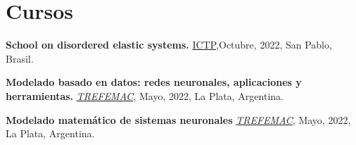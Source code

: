 \documentclass[a4paper,10pt]{article}
\begin{document}
\begin{adjustbox}{valign=t}
\begin{minipage}{0.5\textwidth}
\section*{Cursos}
\begin{description}
    \raggedright
	\item [-] \textbf{School on disordered elastic systems.} \href{https://www.ictp-saifr.org/des2022/}{ICTP},Octubre, 2022, San Pablo, Brasil.
    \item [-] \textbf{Modelado basado en datos: redes neuronales, aplicaciones y herramientas.} 
	{\href{https://sites.google.com/view/trefemac2022}{\it TREFEMAC}}, Mayo, 2022, La Plata, Argentina.
    \item [-] \textbf{Modelado matemático de sistemas neuronales} {\href{https://sites.google.com/view/trefemac2022}{\it TREFEMAC}}, Mayo, 2022, La Plata, Argentina.
\end{description}

\MySkip

\LastUpdate

\end{minipage}
\end{adjustbox}
\end{document}
